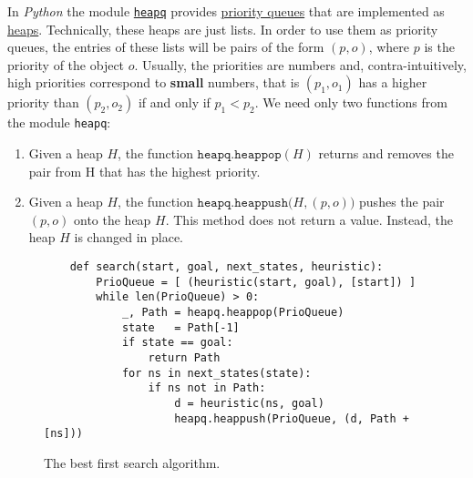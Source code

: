 In \textsl{Python} the module \href{https://docs.python.org/3.7/library/heapq.html}{\texttt{heapq}} provides 
\href{https://en.wikipedia.org/wiki/Priority_queue}{priority queues} that are implemented as 
\href{https://en.wikipedia.org/wiki/Heap_(data_structure)}{heaps}. 
Technically, these heaps are just lists.  In order to use them as priority queues, the entries of these lists
will be pairs of the form $(p, o)$, where $p$ is the priority of the object $o$.  Usually, the priorities are
numbers and, contra-intuitively, high priorities correspond to \textbf{small} numbers, that is $(p_1, o_1)$ has
a higher priority than $(p_2, o_2)$ if and only if $p_1 < p_2$. 
We need only two functions from the module \texttt{heapq}:
\begin{enumerate}
\item Given a heap $H$, the function $\texttt{heapq.heappop}(H)$ returns and removes the pair
      from H that has the highest priority.  
\item Given a heap $H$, the function $\texttt{heapq.heappush}\bigl(H, (p, o)\bigr)$  
      pushes the pair $(p, o)$ onto the heap $H$.  This method does not return a 
      value.  Instead, the heap $H$ is changed in place.
\end{enumerate}


\begin{figure}[!ht]
\centering
\begin{verbatim}
    def search(start, goal, next_states, heuristic):
        PrioQueue = [ (heuristic(start, goal), [start]) ]
        while len(PrioQueue) > 0:
            _, Path = heapq.heappop(PrioQueue)
            state   = Path[-1]
            if state == goal:
                return Path
            for ns in next_states(state):
                if ns not in Path:
                    d = heuristic(ns, goal)
                    heapq.heappush(PrioQueue, (d, Path + [ns]))
\end{verbatim}
\vspace*{-0.3cm}
\caption{The best first search algorithm.}
\label{fig:Best-First-Search.ipynb}
\end{figure}

